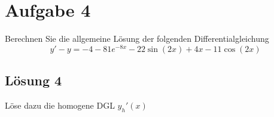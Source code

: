 \documentclass[main.tex]{subfiles}
\begin{document}
\section{Aufgabe 4}
Berechnen Sie die allgemeine Lösung der folgenden Differentialgleichung
\[
y' - y = -4 - 81e^{-8x} - 22\sin(2x) + 4x - 11\cos(2x)
\]

\subsection{Lösung 4}
Löse dazu die homogene DGL $y_h'(x)$
\end{document}
